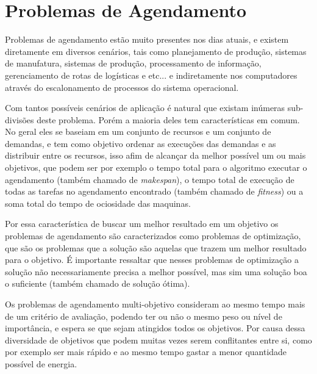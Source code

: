 





















\section{Problemas de Agendamento}
        Problemas de agendamento estão muito presentes nos dias atuais, e existem diretamente em diversos cenários, tais como planejamento de produção, sistemas de manufatura, sistemas de produção, processamento de informação, gerenciamento de rotas de logísticas e etc... e indiretamente nos computadores através do escalonamento de processos do sistema operacional.\newline

        Com tantos possíveis cenários de aplicação é natural que existam inúmeras sub-divisões deste problema. Porém a maioria deles tem características em comum. No geral eles se baseiam em um conjunto de recursos e um conjunto de demandas, e tem como objetivo ordenar as execuções das demandas e as distribuir entre os recursos, isso afim de alcançar da melhor possível um ou mais objetivos, que podem ser por exemplo o tempo total para o algoritmo executar o agendamento (também chamado de \textit{makespan}), o tempo total de execução de todas as tarefas no agendamento encontrado (também chamado de \textit{fitness}) ou a soma total do tempo de ociosidade das maquinas.\newline

        Por essa característica de buscar um melhor resultado em um objetivo os problemas de agendamento são caracterizados como problemas de optimização, que são os problemas que a solução são aquelas que trazem um melhor resultado para o objetivo. É importante ressaltar que nesses problemas de optimização a solução não necessariamente precisa a melhor possível, mas sim uma solução boa o suficiente (também chamado de solução ótima).\newline

        Os problemas de agendamento multi-objetivo consideram ao mesmo tempo mais de um critério de avaliação, podendo ter ou não o mesmo peso ou nível de importância, e espera se que sejam atingidos todos os objetivos. Por causa dessa diversidade de objetivos que podem muitas vezes serem conflitantes entre si, como por exemplo ser mais rápido e ao mesmo tempo gastar a menor quantidade possível de energia.\newline

